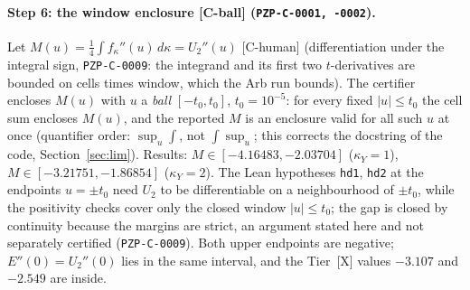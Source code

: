 \documentclass[10pt]{article}
\newcommand{\tier}[1]{\textsf{[#1]}}
\newcommand{\tX}{\tier{X}}
\newcommand{\tCh}{\tier{C-human}}
\newcommand{\tCb}{\textcolor{blue!60!black}{\textsf{[C-ball]}}}
\newcommand{\lean}[1]{\texttt{#1}}
\begin{document}
\paragraph{Step 6: the window enclosure \tCb{} (\texttt{PZP-C-0001, -0002}).} Let $M(u)=\tfrac14\int f_\kappa''(u)\,d\kappa=U_2''(u)$ \tCh{} (differentiation under the integral sign, \texttt{PZP-C-0009}: the integrand and its first two $t$-derivatives are bounded on cells times window, which the Arb run bounds). The certifier encloses $M(u)$ with $u$ a \emph{ball} $[-t_0,t_0]$, $t_0=10^{-5}$: for every fixed $|u|\le t_0$ the cell sum encloses $M(u)$, and the reported $M$ is an enclosure valid for all such $u$ at once (quantifier order: $\sup_u\int$, not $\int\sup_u$; this corrects the docstring of the code, Section~\ref{sec:lim}). Results: $M\in[-4.16483,-2.03704]$ ($\kappa_Y=1$), $M\in[-3.21751,-1.86854]$ ($\kappa_Y=2$). The Lean hypotheses \lean{hd1}, \lean{hd2} at the endpoints $u=\pm t_0$ need $U_2$ to be differentiable on a neighbourhood of $\pm t_0$, while the positivity checks cover only the closed window $|u|\le t_0$; the gap is closed by continuity because the margins are strict, an argument stated here and not separately certified (\texttt{PZP-C-0009}). Both upper endpoints are negative; $E''(0)=U_2''(0)$ lies in the same interval, and the Tier~\tX{} values $-3.107$ and $-2.549$ are inside.
\end{document}
